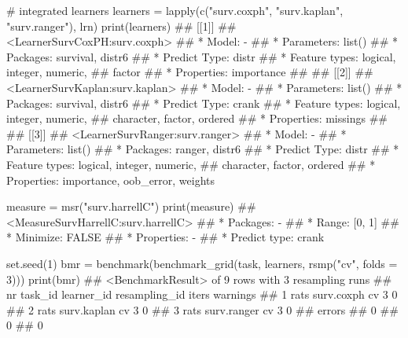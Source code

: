 \documentclass[
  11pt,
  parskip=half,
  DIV=calc,
  BCOR=10mm,
  x11names]{scrbook}
\newenvironment{Shaded}{}{}
\newcommand{\CommentTok}[1]{\textcolor[rgb]{0.00,0.50,0.00}{#1}}
\newcommand{\DataTypeTok}[1]{#1}
\newcommand{\DecValTok}[1]{#1}
\newcommand{\KeywordTok}[1]{\textcolor[rgb]{0.00,0.00,1.00}{#1}}
\newcommand{\NormalTok}[1]{#1}
\newcommand{\StringTok}[1]{\textcolor[rgb]{0.00,0.50,0.50}{#1}}
\begin{document}
\begin{Shaded}
\begin{Highlighting}[]
\CommentTok{# integrated learners}
\NormalTok{learners =}\StringTok{ }\KeywordTok{lapply}\NormalTok{(}\KeywordTok{c}\NormalTok{(}\StringTok{"surv.coxph"}\NormalTok{, }\StringTok{"surv.kaplan"}\NormalTok{, }\StringTok{"surv.ranger"}\NormalTok{), }
\NormalTok{  lrn)}
\KeywordTok{print}\NormalTok{(learners)}
\NormalTok{## [[1]]}
\NormalTok{## <LearnerSurvCoxPH:surv.coxph>}
\NormalTok{## * Model: -}
\NormalTok{## * Parameters: list()}
\NormalTok{## * Packages: survival, distr6}
\NormalTok{## * Predict Type: distr}
\NormalTok{## * Feature types: logical, integer, numeric,}
\NormalTok{##   factor}
\NormalTok{## * Properties: importance}
\NormalTok{## }
\NormalTok{## [[2]]}
\NormalTok{## <LearnerSurvKaplan:surv.kaplan>}
\NormalTok{## * Model: -}
\NormalTok{## * Parameters: list()}
\NormalTok{## * Packages: survival, distr6}
\NormalTok{## * Predict Type: crank}
\NormalTok{## * Feature types: logical, integer, numeric,}
\NormalTok{##   character, factor, ordered}
\NormalTok{## * Properties: missings}
\NormalTok{## }
\NormalTok{## [[3]]}
\NormalTok{## <LearnerSurvRanger:surv.ranger>}
\NormalTok{## * Model: -}
\NormalTok{## * Parameters: list()}
\NormalTok{## * Packages: ranger, distr6}
\NormalTok{## * Predict Type: distr}
\NormalTok{## * Feature types: logical, integer, numeric,}
\NormalTok{##   character, factor, ordered}
\NormalTok{## * Properties: importance, oob_error, weights}

\NormalTok{measure =}\StringTok{ }\KeywordTok{msr}\NormalTok{(}\StringTok{"surv.harrellC"}\NormalTok{)}
\KeywordTok{print}\NormalTok{(measure)}
\NormalTok{## <MeasureSurvHarrellC:surv.harrellC>}
\NormalTok{## * Packages: -}
\NormalTok{## * Range: [0, 1]}
\NormalTok{## * Minimize: FALSE}
\NormalTok{## * Properties: -}
\NormalTok{## * Predict type: crank}

\KeywordTok{set.seed}\NormalTok{(}\DecValTok{1}\NormalTok{)}
\NormalTok{bmr =}\StringTok{ }\KeywordTok{benchmark}\NormalTok{(}\KeywordTok{benchmark_grid}\NormalTok{(task, learners, }\KeywordTok{rsmp}\NormalTok{(}\StringTok{"cv"}\NormalTok{, }
  \DataTypeTok{folds =} \DecValTok{3}\NormalTok{)))}
\KeywordTok{print}\NormalTok{(bmr)}
\NormalTok{## <BenchmarkResult> of 9 rows with 3 resampling runs}
\NormalTok{##  nr task_id  learner_id resampling_id iters warnings}
\NormalTok{##   1    rats  surv.coxph            cv     3        0}
\NormalTok{##   2    rats surv.kaplan            cv     3        0}
\NormalTok{##   3    rats surv.ranger            cv     3        0}
\NormalTok{##  errors}
\NormalTok{##       0}
\NormalTok{##       0}
\NormalTok{##       0}
\end{Highlighting}
\end{Shaded}
\end{document}
